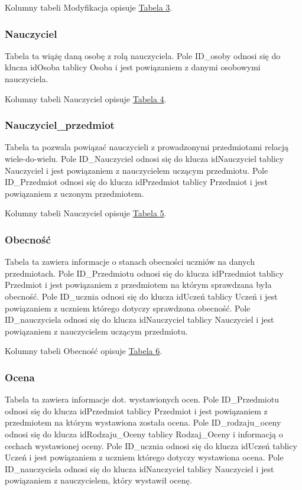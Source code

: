 \documentclass[10pt,a4paper,notitlepage]{article}
\begin{document}
Kolumny tabeli Modyfikacja opisuje \hyperref[tab3]{Tabela 3}.

\subsubsection{Nauczyciel}
Tabela ta wiążę daną osobę z rolą nauczyciela. Pole ID\_osoby odnosi się do klucza idOsoba tablicy Osoba i jest powiązaniem z danymi osobowymi nauczyciela.

Kolumny tabeli Nauczyciel opisuje \hyperref[tab4]{Tabela 4}.

\subsubsection{Nauczyciel\_przedmiot}
Tabela ta pozwala powiązać nauczycieli z prowadzonymi przedmiotami relacją wiele-do-wielu. Pole ID\_Nauczyciel odnosi się do klucza idNauczyciel tablicy Nauczyciel i jest powiązaniem z nauczycielem uczącym przedmiotu. Pole ID\_Przedmiot odnosi się do klucza idPrzedmiot tablicy Przedmiot i jest powiązaniem z uczonym przedmiotem.

Kolumny tabeli Nauczyciel opisuje \hyperref[tab5]{Tabela 5}.
\subsubsection{Obecność}
Tabela ta zawiera informacje o stanach obecności uczniów na danych przedmiotach. Pole ID\_Przedmiotu odnosi się do klucza idPrzedmiot tablicy Przedmiot i jest powiązaniem z przedmiotem na którym sprawdzana była obecność. Pole ID\_ucznia odnosi się do klucza idUczeń tablicy Uczeń i jest powiązaniem z uczniem którego dotyczy sprawdzona obecność. Pole ID\_nauczyciela odnosi się do klucza idNauczyciel tablicy Nauczyciel i jest powiązaniem z nauczycielem uczącym przedmiotu. 

Kolumny tabeli Obecność opisuje \hyperref[tab6]{Tabela 6}.
\subsubsection{Ocena}
Tabela ta zawiera informacje dot. wystawionych ocen. Pole ID\_Przedmiotu odnosi się do klucza idPrzedmiot tablicy Przedmiot i jest powiązaniem z przedmiotem na którym wystawiona została ocena. Pole ID\_rodzaju\_oceny odnosi się do klucza idRodzaju\_Oceny tablicy Rodzaj\_Oceny i informacją o cechach wystawionej oceny. Pole ID\_ucznia odnosi się do klucza idUczeń tablicy Uczeń i jest powiązaniem z uczniem którego dotyczy wystawiona ocena. Pole ID\_nauczyciela odnosi się do klucza idNauczyciel tablicy Nauczyciel i jest powiązaniem z nauczycielem, który wystawił ocenę. 
\end{document}
